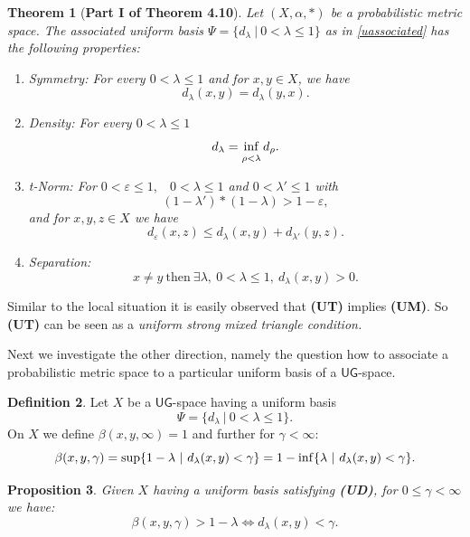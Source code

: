 \documentclass[12pt,a4paper]{amsart}
\theoremstyle{theorem}
\newtheorem{theorem}{Theorem}[section]
\newtheorem{proposition}[theorem]{Proposition}
\theoremstyle{definition}
\newtheorem{definition}[theorem]{Definition}
\newcommand{\ug}{\ensuremath{\mathsf{UG}}}
\renewcommand{\inf}{\myinf}
\DeclareMathOperator*{\myinf}{in\vphantom{p}f}
\renewcommand{\a}{\ensuremath{\alpha}}
\renewcommand{\b}{\ensuremath{\beta}}
\newcommand{\ve}{\ensuremath{\varepsilon}}
\renewcommand{\l}{\ensuremath{\lambda}}
\begin{document}
{\begin{theorem}[\bf Part I of Theorem 4.10]\label{uchar}
 Let $(X,\a,*)$ be a probabilistic metric space. The associated uniform basis $\Psi = \{ d_\l \ | \ 0 < \l \leq 1 \}$
 as in \eqref{uassociated} has the following properties: 
\begin{enumerate}
\item [{\bf(US)}] Symmetry: For every $0 < \l \leq 1$ and for $x,y \in X$, we have 
$$d_\l (x, y) = d_\l (y, x).$$
\item [{\bf(UD)}] Density:  For every $0 < \l \leq 1$ 
$$
d_\l = \inf _{\rho < \l} d_\rho.
$$ 
\item[{\bf(UT)}] t-Norm: For $0< \ve \leq 1,$ \ $0 < \l \leq 1$ and $0 < \l' \leq 1$ with 
$$
 (1 - \l') * ( 1 - \l) > 1 - \ve,
$$
 and for $x,y,z \in X$ we have
$$
d_\ve(x, z) \leq d_\l(x, y) + d_{\l'}(y, z).
$$
\item [{\bf(UH)}] Separation:
$$
x \not = y \ \text{then} \  \exists\l, \  0 < \l \leq 1, \ d_\l (x,y) > 0.
$$

\end{enumerate}

\end{theorem}
Similar to the local situation it is easily observed that {\bf(UT)} implies {\bf(UM)}. So {\bf(UT)} can be seen as a \emph{uniform strong mixed triangle condition.}



Next we investigate the other direction, namely the question how to associate a probabilistic metric space to a particular uniform basis of a $\ug$-space.

\begin{definition}\label{reconstruction}
Let $X$ be a $\ug$-space having a uniform basis
$$
\Psi = \{ d_\l \ | \ 0  < \l \leq 1 \}.
$$
On $X$ we define $\b (x,y, \infty ) = 1$ and further for $\gamma < \infty$:
\begin{equation}\label{ubeta}
\b(x,y,\gamma) = \sup \{1 - \l \ | \ d_\l(x, y) < \gamma\} = 1 - \inf  \{\l \ | \ d_\l (x, y) < \gamma\}.
\end{equation}

\end{definition}


\begin{proposition}\label{uequivbeta}
Given $X$ having a uniform basis satisfying {\bf(UD)},
for $0 \leq \gamma < \infty$ we have:
$$
\b(x,y,\gamma) > 1 - \l   \Leftrightarrow  d_\l(x, y) < \gamma.
$$
\end{proposition}

}
\end{document}
